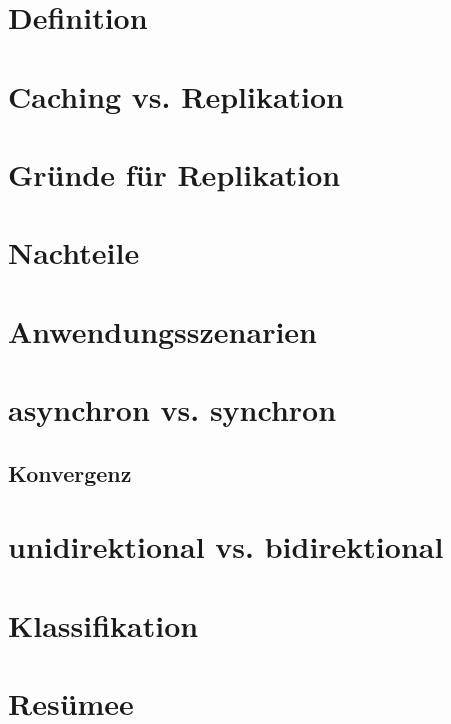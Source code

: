 
\section{Definition}

\section{Caching vs. Replikation}

\section{Gründe für Replikation}

\section{Nachteile}

\section{Anwendungsszenarien}

\section{asynchron vs. synchron}

\subsection{Konvergenz}

\section{unidirektional vs. bidirektional}

\section{Klassifikation}

\section{Resümee}